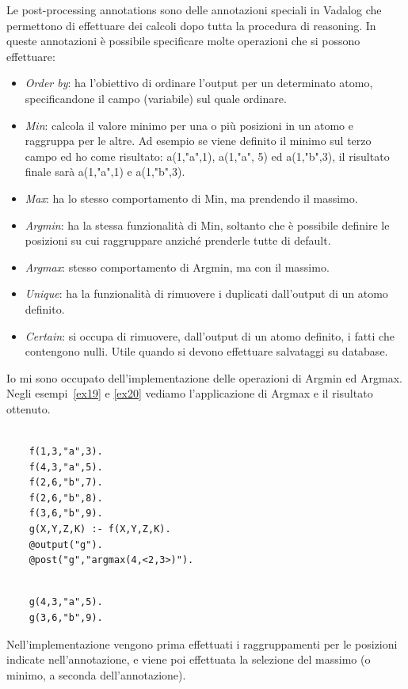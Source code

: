 Le post-processing annotations sono delle annotazioni speciali in Vadalog che permettono di effettuare dei calcoli dopo tutta la procedura di reasoning. 
In queste annotazioni è possibile specificare molte operazioni che si possono effettuare:
\begin{itemize}
	\item \emph{Order by}: ha l'obiettivo di ordinare l'output per un determinato atomo, specificandone il campo (variabile) sul quale ordinare.
	\item \emph{Min}: calcola il valore minimo per una o più posizioni in un atomo e raggruppa per le altre. Ad esempio se viene definito il minimo sul terzo campo ed ho come risultato: a(1,"a",1), a(1,"a", 5) ed a(1,"b",3), il risultato finale sarà a(1,"a",1) e  a(1,"b",3).
	\item \emph{Max}: ha lo stesso comportamento di Min, ma prendendo il massimo.
	\item \emph{Argmin}: ha la stessa funzionalità di Min, soltanto che è possibile definire le posizioni su cui raggruppare anziché prenderle tutte di default. 
	\item \emph{Argmax}: stesso comportamento di Argmin, ma con il massimo.
	\item \emph{Unique}: ha la funzionalità di rimuovere i duplicati dall'output di un atomo definito.
	\item \emph{Certain}: si occupa di rimuovere, dall'output di un atomo definito, i fatti che contengono nulli. Utile quando si devono effettuare salvataggi su database.
\end{itemize}
Io mi sono occupato dell'implementazione delle operazioni di Argmin ed Argmax. \newline
Negli esempi~\ref{ex19} e \ref{ex20} vediamo l'applicazione di Argmax e il risultato ottenuto.
\begin{example}\label{ex19}
\normalfont
{}
	\begin{lstlisting}
		
	f(1,3,"a",3).
	f(4,3,"a",5).
	f(2,6,"b",7).
	f(2,6,"b",8).
	f(3,6,"b",9).
	g(X,Y,Z,K) :- f(X,Y,Z,K).
	@output("g").
	@post("g","argmax(4,<2,3>)").
	\end{lstlisting}
\end{example}
\begin{example}\label{ex20}
\normalfont
	\begin{lstlisting}
	
	g(4,3,"a",5).
	g(3,6,"b",9).
	\end{lstlisting}
\end{example}
Nell'implementazione vengono prima effettuati i raggruppamenti per le posizioni indicate nell'annotazione, e viene poi effettuata la selezione del massimo (o minimo, a seconda dell'annotazione). 

